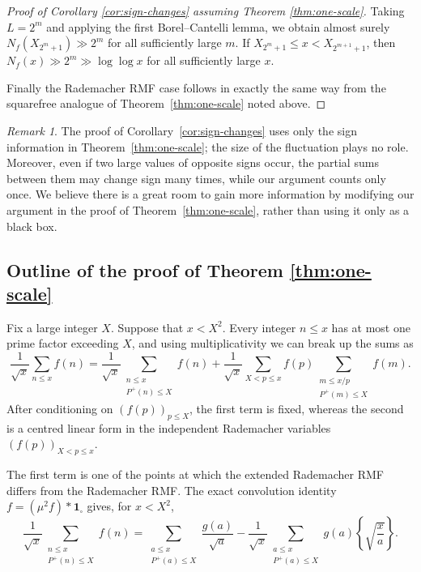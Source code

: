 \documentclass[a4paper,12pt,reqno]{amsart}
\numberwithin{equation}{section}
\theoremstyle{remark}
\newtheorem{remark}[theorem]{Remark}
\begin{document}
\begin{proof}[Proof of Corollary \ref{cor:sign-changes} assuming Theorem \ref{thm:one-scale}]
Taking $L=2^m$ and applying the first Borel--Cantelli lemma, we obtain
almost surely
$N_f(X_{2^m+1})\gg2^m$ for all sufficiently large $m$.
If $X_{2^m+1}\leq x<X_{2^{m+1}+1}$, then
$N_f(x)\gg 2^m \gg\log\log x$ for all sufficiently large $x$. %

Finally the Rademacher RMF case  follows in exactly the same way from the squarefree
analogue of Theorem~\ref{thm:one-scale} noted above.
\end{proof}


\begin{remark}
The proof of Corollary~\ref{cor:sign-changes} uses only the sign
information in Theorem~\ref{thm:one-scale}; the size of the fluctuation
plays no role. Moreover, even if two large values of opposite signs occur, the partial sums between them may change sign many
times, while our argument counts
only once. We believe there is a great room to gain more information by modifying our argument in the proof of
Theorem~\ref{thm:one-scale}, rather than using it only as a black box.
\end{remark}


\subsection{Outline of the proof of Theorem \ref{thm:one-scale}}
Fix a large integer $X$. Suppose that \(x<X^2\). Every integer \(n\leq x\) has at most one prime
factor exceeding \(X\), and using multiplicativity we can break up the sums as
\[
 \frac{1}{\sqrt x}\sum_{n\leq x}f(n)
 =
 \frac{1}{\sqrt x}
 \sum_{\substack{n\leq x\\P^+(n)\leq X}}f(n)
 +
 \frac{1}{\sqrt x}\sum_{X<p\leq x}f(p)
 \sum_{\substack{m\leq x/p\\P^+(m)\leq X}}f(m).
\]
After conditioning on \((f(p))_{p\leq X}\), the first term is fixed, whereas
the second is a centred linear form in the independent Rademacher variables
\((f(p))_{X<p\le x}\).

The first term is one of the points at which the extended Rademacher
RMF differs from the Rademacher RMF. The exact convolution identity
$
 f=(\mu^2f)*\mathbf 1_{\square}
$
gives, for \(x<X^2\),
\begin{equation}\label{eq:convolution-intro}
 \frac{1}{\sqrt x}
 \sum_{\substack{n\leq x\\P^+(n)\leq X}}f(n)
 =
 \sum_{\substack{a\leq x\\P^+(a)\leq X}}\frac{g(a)}{\sqrt a}
 -
 \frac{1}{\sqrt x}
 \sum_{\substack{a\leq x\\P^+(a)\leq X}}
 g(a)\left\{\sqrt{\frac xa}\right\}.
\end{equation}
\end{document}
